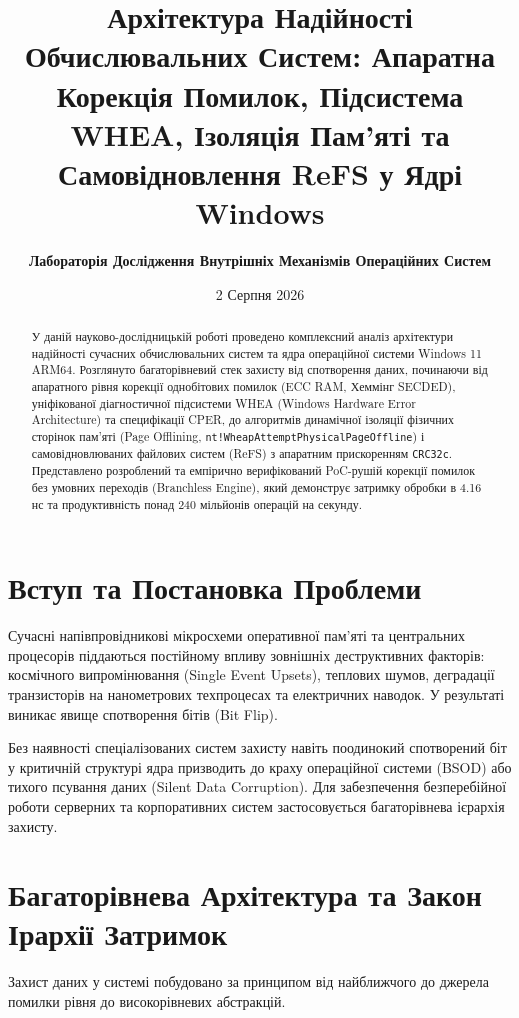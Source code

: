\documentclass[12pt,a4paper]{article}
\title{\textbf{Архітектура Надійності Обчислювальних Систем: Апаратна Корекція Помилок, Підсистема WHEA, Ізоляція Пам'яті та Самовідновлення ReFS у Ядрі Windows}}
\author{\textbf{Лабораторія Дослідження Внутрішніх Механізмів Операційних Систем}}
\date{2 Серпня 2026}
\begin{document}
\maketitle

\begin{abstract}
У даній науково-дослідницькій роботі проведено комплексний аналіз архітектури надійності сучасних обчислювальних систем та ядра операційної системи Windows 11 ARM64. Розглянуто багаторівневий стек захисту від спотворення даних, починаючи від апаратного рівня корекції однобітових помилок (ECC RAM, Хеммінг SECDED), уніфікованої діагностичної підсистеми WHEA (Windows Hardware Error Architecture) та специфікації CPER, до алгоритмів динамічної ізоляції фізичних сторінок пам'яті (Page Offlining, \texttt{nt!WheapAttemptPhysicalPageOffline}) і самовідновлюваних файлових систем (ReFS) з апаратним прискоренням \texttt{CRC32c}. Представлено розроблений та емпірично верифікований PoC-рушій корекції помилок без умовних переходів (Branchless Engine), який демонструє затримку обробки в 4.16 нс та продуктивність понад 240 мільйонів операцій на секунду.
\end{abstract}

\tableofcontents
\newpage

\section{Вступ та Постановка Проблеми}
Сучасні напівпровідникові мікросхеми оперативної пам'яті та центральних процесорів піддаються постійному впливу зовнішніх деструктивних факторів: космічного випромінювання (Single Event Upsets), теплових шумов, деградації транзисторів на нанометрових техпроцесах та електричних наводок. У результаті виникає явище спотворення бітів (Bit Flip).

Без наявності спеціалізованих систем захисту навіть поодинокий спотворений біт у критичній структурі ядра призводить до краху операційної системи (BSOD) або тихого псування даних (Silent Data Corruption). Для забезпечення безперебійної роботи серверних та корпоративних систем застосовується багаторівнева ієрархія захисту.

\section{Багаторівнева Архітектура та Закон Ірархії Затримок}

Захист даних у системі побудовано за принципом від найближчого до джерела помилки рівня до високорівневих абстракцій.
\end{document}

